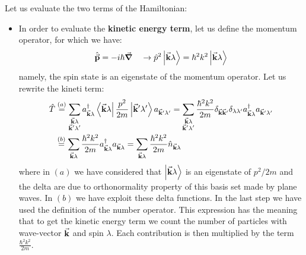 \documentclass[../main/main.tex]{subfiles}
\begin{document}
Let us evaluate the two terms of the Hamiltonian:
\begin{itemize}
\item In order to evaluate the \textbf{kinetic energy term}, let us define the momentum operator, for which we have:
\begin{equation*}
\hat{\va{p}} = - i \hbar \va{\grad } \quad \rightarrow  \hat{p}^2 \ket{\va{k} \lambda } = \hbar ^2 k^2  \ket{\va{k} \lambda }
\end{equation*}
namely, the spin state is an eigenstate of the momentum operator.
Let us rewrite the kineti term:
\begin{equation*}
\begin{split}
 \hat{T}   & \overset{(a)}{=}  \sum_{\substack{\va{k} \lambda  \\ \va{k}' \lambda' } }^{}   a_{\va{k} \lambda } ^\dag \bra{\va{k} \lambda } \frac{p^2}{2m} \ket{\va{k}' \lambda '} a_{\va{k}' \lambda'}
 = \sum_{\substack{\va{k} \lambda  \\ \va{k}' \lambda' } }^{} \frac{\hbar ^2k^2}{2m} \delta _{\va{k}\va{k}'} \delta _{\lambda \lambda '} a_{\va{k}\lambda } ^\dag a_{\va{k}'\lambda '}\\
 &\overset{(b)}{=} \sum_{\va{k} \lambda }^{} \frac{\hbar ^2 k^2}{2m} a_{\va{k}\lambda }^\dag a_{\va{k}\lambda }= \sum_{\va{k} \lambda }^{} \frac{\hbar ^2 k^2}{2m} \hat{n}_{\va{k} \lambda }
\end{split}
\end{equation*}
where in \( (a) \) we have considered that \( \ket{\va{k} \lambda }  \) is an eigenstate of \( p^2/2m \) and the delta are due to orthonormality property of this basis set made by plane waves. In \( (b) \) we have exploit these delta functions. In the last step we have used the definition of the number operator.
This expression has the meaning that to get the kinetic energy term we count the number of particles with wave-vector \( \va{k} \) and spin \( \lambda  \). Each contribution is then multiplied by the term \( \frac{\hbar ^2 k^2}{2m}  \).


\end{itemize}
\end{document}
